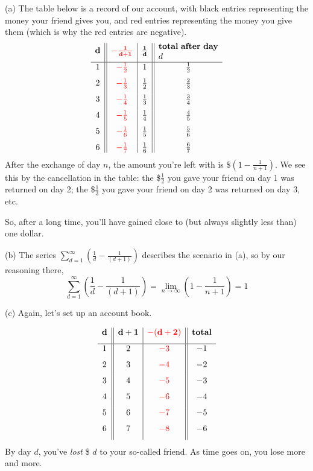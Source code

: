 \begin{solution}
(a) The table below is a record of our account, with black entries representing the money your friend gives you, and red entries representing the money you give them (which is why the red entries are negative).
\[\begin{array}{c||c|c||c}
\mathbf{d}&\color{red}\mathbf{-\frac{1}{d+1}}&\mathbf{\frac1d}&\parbox{2.5cm}{\textbf{total after day $d$}}\\[7pt]
\hline
1 & \color{red} -\frac{1}{2} & 1 & \frac{1}{2}\\[7pt]
2&\color{red}-\frac{1}{3} & \frac{1}{2}&\frac{2}{3}\\[7pt]
3&\color{red}-\frac{1}{4} & \frac{1}{3}&\frac{3}{4}\\[7pt]
4&\color{red}-\frac{1}{5} & \frac{1}{4}&\frac{4}{5}\\[7pt]
5&\color{red}-\frac{1}{6} & \frac{1}{5}&\frac{5}{6}\\[7pt]
6&\color{red}-\frac{1}{7} & \frac{1}{6}&\frac{6}{7}
\end{array}\]
After the exchange of day $n$, the amount you're left with is $\$\left(1-\frac{1}{n+1}\right)$. We see this by the cancellation in the table: the \$$\frac12$ you gave your friend on day 1 was returned on day 2; the  \$$\frac13$ you gave your friend on day 2 was returned on day 3, etc.

So, after a long time, you'll have gained close to (but always slightly less than) one dollar.

(b) The series $\displaystyle\sum_{d=1}^\infty \left(\frac{1}{d}-\frac{1}{(d+1)}\right)$ describes the scenario in (a), so by our reasoning there,
\[\displaystyle\sum_{d=1}^\infty \left(\frac{1}{d}-\frac{1}{(d+1)}\right) = \lim_{n \to \infty}\left(1-\frac{1}{n+1}\right)=1\]

(c) Again, let's set up an account book.

\[\begin{array}{c||c|c||c}
\mathbf{d}&\mathbf{d+1}&\color{red}\mathbf{-(d+2)}&\textbf{total}\\[7pt]
\hline
1 & 2& \color{red} -3 & -1\\[7pt]
2 & 3& \color{red} -4 & -2\\[7pt]
3 & 4& \color{red} -5 & -3\\[7pt]
4 & 5& \color{red} -6 & -4\\[7pt]
5 & 6& \color{red} -7 & -5\\[7pt]
6 & 7& \color{red} -8 & -6\\[7pt]
\end{array}\]
By day $d$, you've \emph{lost} \$ $d$ to your so-called friend. As time goes on, you lose more and more.


\end{solution}
